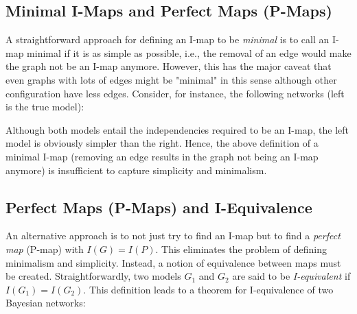 		\subsection{Minimal I-Maps and Perfect Maps (P-Maps)}
			A straightforward approach for defining an I-map to be \emph{minimal} is to call an I-map minimal if it is as simple as possible, i.e., the removal of an edge would make the graph not be an I-map anymore. However, this has the major caveat that even graphs with lots of edges might be "minimal" in this sense although other configuration have less edges. Consider, for instance, the following networks (left is the true model):
			\begin{center}
			\end{center}
			Although both models entail the independencies required to be an I-map, the left model is obviously simpler than the right. Hence, the above definition of a minimal I-map (removing an edge results in the graph not being an I-map anymore) is insufficient to capture simplicity and minimalism.

		\subsection{Perfect Maps (P-Maps) and I-Equivalence}
			An alternative approach is to not just try to find an I-map but to find a \emph{perfect map} (P-map) with \( I(G) = I(P) \). This eliminates the problem of defining minimalism and simplicity. Instead, a notion of equivalence between maps must be created. Straightforwardly, two models \(G_1\) and \(G_2\) are said to be \emph{I-equivalent} if \( I(G_1) = I(G_2) \). This definition leads to a theorem for I-equivalence of two Bayesian networks:

